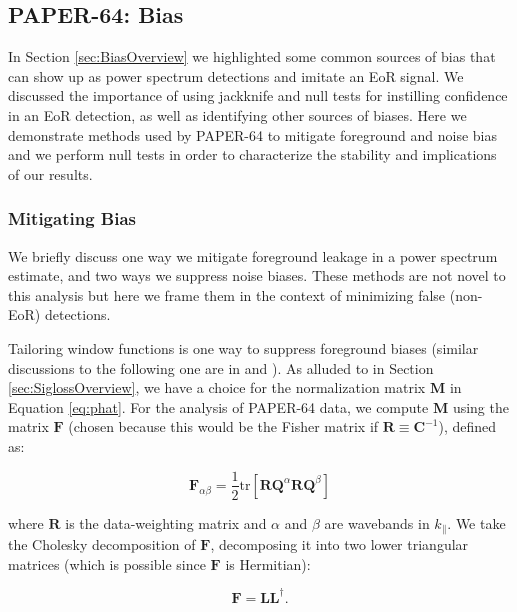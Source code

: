 \documentclass[preprint2,numberedappendix,tighten]{aastex6}
\begin{document}

\subsection{PAPER-64: Bias}
\label{sec:Bias}

In Section \ref{sec:BiasOverview} we highlighted some common sources of bias that can show up as power spectrum 
detections and imitate an EoR signal. We discussed the importance of using jackknife and null tests for instilling confidence in an EoR 
detection, as well as identifying other sources of biases. Here we demonstrate methods used by PAPER-64 to mitigate 
foreground and noise bias and we perform null tests in order to characterize the stability and implications of our results.

\subsubsection{Mitigating Bias}
\label{sec:MitBias}

We briefly discuss one way we mitigate foreground leakage in a power spectrum estimate, and two ways we 
suppress noise biases. These methods are not novel to this analysis but here we frame them in the context of minimizing false 
(non-EoR) detections. 

Tailoring window functions is one way to suppress foreground biases (similar discussions to the following one are in \citet{liu_et_al2014b} and ). As alluded to in Section \ref{sec:SiglossOverview}, we 
have a choice for the normalization matrix $\textbf{M}$ in Equation \eqref{eq:phat}. For the analysis of PAPER-64 data, we 
compute $\textbf{M}$ using the matrix $\textbf{F}$ (chosen because this would be the Fisher matrix if $\textbf{R} \equiv \textbf{C}^{-1}$), defined as:

\begin{equation}
\textbf{F}_{\alpha\beta} = \frac{1}{2} \text{tr} [\textbf{R}\textbf{Q}^{\alpha}\textbf{R}\textbf{Q}^{\beta} ]
\end{equation}

\noindent where $\textbf{R}$ is the data-weighting matrix and $\alpha$ and $\beta$ are wavebands in $k_{\parallel}$. We take 
the Cholesky decomposition of $\textbf{F}$, decomposing it into two lower triangular matrices (which is possible since $\textbf{F}$ is Hermitian):

\begin{equation}
\textbf{F} = \textbf{LL}^{\dagger}.
\end{equation}
\end{document}
